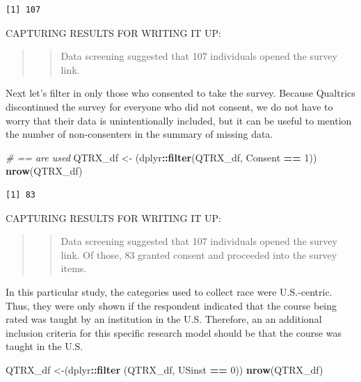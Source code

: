 \documentclass[
  11pt,
]{book}
\newenvironment{Shaded}{\begin{snugshade}}{\end{snugshade}}
\newcommand{\CommentTok}[1]{\textcolor[rgb]{0.37,0.37,0.37}{\textit{#1}}}
\newcommand{\DecValTok}[1]{\textcolor[rgb]{0.06,0.06,0.06}{#1}}
\newcommand{\FunctionTok}[1]{\textcolor[rgb]{0.27,0.27,0.27}{\textbf{#1}}}
\newcommand{\NormalTok}[1]{#1}
\newcommand{\OtherTok}[1]{\textcolor[rgb]{0.37,0.37,0.37}{#1}}
\newcommand{\SpecialCharTok}[1]{\textcolor[rgb]{0.43,0.43,0.43}{\textbf{#1}}}
\begin{document}
\begin{verbatim}
[1] 107
\end{verbatim}

CAPTURING RESULTS FOR WRITING IT UP:

\begin{quote}
\begin{quote}
Data screening suggested that 107 individuals opened the survey link.
\end{quote}
\end{quote}

Next let's filter in only those who consented to take the survey. Because Qualtrics discontinued the survey for everyone who did not consent, we do not have to worry that their data is unintentionally included, but it can be useful to mention the number of non-consenters in the summary of missing data.

\begin{Shaded}
\begin{Highlighting}[]
\CommentTok{\# == are used}
\NormalTok{QTRX\_df }\OtherTok{\textless{}{-}}\NormalTok{ (dplyr}\SpecialCharTok{::}\FunctionTok{filter}\NormalTok{(QTRX\_df, Consent }\SpecialCharTok{==} \DecValTok{1}\NormalTok{))}
\FunctionTok{nrow}\NormalTok{(QTRX\_df)}
\end{Highlighting}
\end{Shaded}

\begin{verbatim}
[1] 83
\end{verbatim}

CAPTURING RESULTS FOR WRITING IT UP:

\begin{quote}
\begin{quote}
Data screening suggested that 107 individuals opened the survey link. Of those, 83 granted consent and proceeded into the survey items.
\end{quote}
\end{quote}

In this particular study, the categories used to collect race were U.S.-centric. Thus, they were only shown if the respondent indicated that the course being rated was taught by an institution in the U.S. Therefore, an an additional inclusion criteria for this specific research model should be that the course was taught in the U.S.

\begin{Shaded}
\begin{Highlighting}[]
\NormalTok{QTRX\_df }\OtherTok{\textless{}{-}}\NormalTok{(dplyr}\SpecialCharTok{::}\FunctionTok{filter}\NormalTok{ (QTRX\_df, USinst }\SpecialCharTok{==} \DecValTok{0}\NormalTok{))}
\FunctionTok{nrow}\NormalTok{(QTRX\_df)}
\end{Highlighting}
\end{Shaded}
\end{document}
